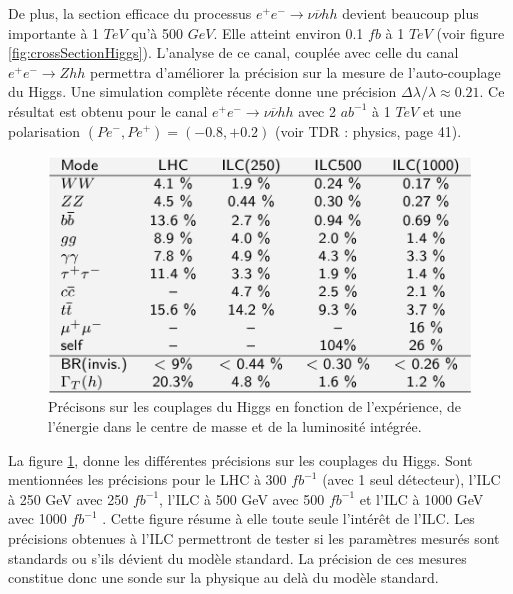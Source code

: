    \medskip
   
   De plus, la section efficace du processus $e^+ e^- \rightarrow \nu \overline{\nu} h h$ devient beaucoup plus importante \`a 1 $TeV$ qu'\`a 500 $GeV$. Elle atteint environ 0.1 $fb$ \`a 1 $TeV$ (voir figure \ref{fig:crossSectionHiggs}). L'analyse de ce canal, coupl\'ee avec celle du canal $e^+ e^- \rightarrow Z h h$ permettra d'am\'eliorer la pr\'ecision sur la mesure de l'auto-couplage du Higgs. Une simulation compl\`ete r\'ecente donne une pr\'ecision $\Delta \lambda / \lambda \approx 0.21$. Ce r\'esultat est obtenu pour le canal $e^+ e^- \rightarrow \nu \overline{\nu} h h$ avec 2 $ab^{-1}$ \`a 1 $TeV$ et une polarisation $(P e^- , P e^+ ) = (-0.8, +0.2)$ (voir TDR : physics, page 41).
   
   \medskip

   \begin{figure}[!htb]
    \begin{center} 
      \includegraphics[scale=0.40]{./figures/Comparaison_couplage_1TeV.png}
      \caption{Pr\'ecisons sur les couplages du Higgs en fonction de l'exp\'erience, de l'\'energie dans le centre de masse et de la luminosit\'e int\'egr\'ee. \cite{Peskin:2012we}}
     \label{fig:Comp_BR_1000GeV}
     \end{center}
  \end{figure} 
   
   La figure \ref{fig:Comp_BR_1000GeV}, donne les diff\'erentes pr\'ecisions sur les couplages du Higgs. Sont mentionn\'ees les pr\'ecisions pour le LHC \`a 300 $fb^{-1}$ (avec 1 seul d\'etecteur), l'ILC \`a 250 GeV avec 250 $fb^{-1}$, l'ILC \`a 500 GeV avec 500 $fb^{-1}$ et l'ILC \`a 1000 GeV avec 1000 $fb^{-1}$ \cite{Peskin:2012we}. Cette figure r\'esume \`a elle toute seule l'int\'er\^et de l'ILC. Les pr\'ecisions obtenues \`a l'ILC permettront de tester si les param\`etres mesur\'es sont standards ou s'ils d\'evient du mod\`ele standard. La pr\'ecision de ces mesures constitue donc une sonde sur la physique au delà du mod\`ele standard.
   
